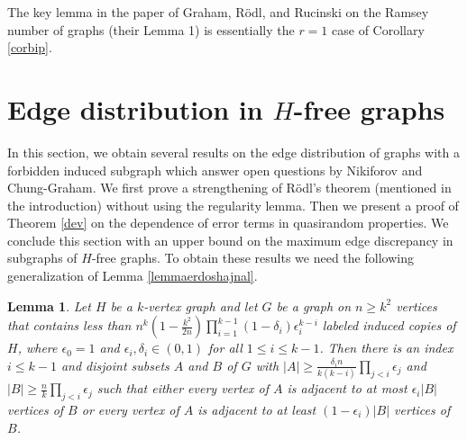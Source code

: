 \documentclass[11pt]{article}
\newtheorem{lemma}[theorem]{Lemma}
\begin{document}
The key lemma in the paper of Graham, R\"odl, and Rucinski
\cite{GrRoRu} on the Ramsey number of graphs (their Lemma 1) is
essentially the $r=1$ case of Corollary \ref{corbip}.

\section{Edge distribution in $H$-free graphs}\label{sectionmulticolor}

In this section, we obtain several results on the edge distribution of
graphs with a forbidden induced subgraph which answer open questions by
Nikiforov and Chung-Graham. We first prove a strengthening of R\"odl's
theorem (mentioned in the introduction) without using the regularity lemma.
Then we present a proof of Theorem \ref{dev} on the
dependence of error terms in quasirandom properties. We
conclude this section with an upper bound on the maximum edge discrepancy
in subgraphs of $H$-free graphs.
To obtain these results we need the following generalization of Lemma
\ref{lemmaerdoshajnal}.

\begin{lemma}\label{lemmaerdoshajnal4}
Let $H$ be a $k$-vertex graph and let $G$ be a graph on $n \geq k^2$ vertices
that contains less than $n^{k}(1-\frac{k^2}{2n})\prod_{i=1}^{k-1} (1-\delta_i)\epsilon_i^{k-i}$
labeled induced copies of $H$, where $\epsilon_0=1$ and $\epsilon_i,\delta_{i} \in (0,1)$ for all
$1 \leq i \leq k-1$. Then there is an index $i\leq k-1$ and disjoint subsets $A$ and $B$ of $G$ with
$|A|\geq \frac{\delta_in}{k(k-i)}\prod_{j<i} \epsilon_j$ and $|B|
\geq \frac{n}{k}\prod_{j < i} \epsilon_j$ such that either every vertex of $A$
is adjacent to at most $\epsilon_i|B|$ vertices of $B$ or every
vertex of $A$ is adjacent to at least $(1-\epsilon_i)|B|$ vertices
of $B$.
\end{lemma}
\end{document}
